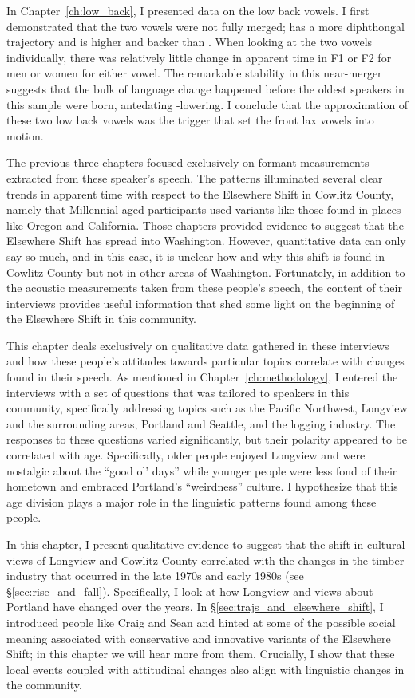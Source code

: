 In Chapter~\ref{ch:low_back}, I presented data on the low back vowels. I first demonstrated that the two vowels were not fully merged;  \thought has a more diphthongal trajectory and is higher and backer than \lot. When looking at the two vowels individually, there was relatively little change in apparent time in F1 or F2 for men or women for either vowel. The remarkable stability in this near-merger suggests that the bulk of language change happened before the oldest speakers in this sample were born, antedating \bat-lowering. I conclude that the approximation of these two low back vowels was the trigger that set the front lax vowels into motion.

The previous three chapters focused exclusively on formant measurements extracted from these speaker's speech. The patterns illuminated several clear trends in apparent time with respect to the Elsewhere Shift in Cowlitz County, namely that Millennial-aged participants used variants like those found in places like Oregon and California. Those chapters provided evidence to suggest that the Elsewhere Shift has spread into Washington. However, quantitative data can only say so much, and in this case, it is unclear how and why this shift is found in Cowlitz County but not in other areas of Washington. Fortunately, in addition to the acoustic measurements taken from these people's speech, the content of their interviews provides useful information that shed some light on the beginning of the Elsewhere Shift in this community.

This chapter deals exclusively on qualitative data gathered in these interviews and how these people's attitudes towards particular topics correlate with changes found in their speech. As mentioned in Chapter~\ref{ch:methodology}, I entered the interviews with a set of questions that was tailored to speakers in this community, specifically addressing topics such as the Pacific Northwest, Longview and the surrounding areas, Portland and Seattle, and the logging industry. The responses to these questions varied significantly, but their polarity appeared to be correlated with age. Specifically, older people enjoyed Longview and were nostalgic about the ``good ol' days'' while younger people were less fond of their hometown and embraced Portland's ``weirdness'' culture. I hypothesize that this age division plays a major role in the linguistic patterns found among these people.

In this chapter, I present qualitative evidence to suggest that the shift in cultural views of Longview and Cowlitz County correlated with the changes in the timber industry that occurred in the late 1970s and early 1980s (see \S\ref{sec:rise_and_fall}). Specifically, I look at how Longview and views about Portland have changed over the years. In \S\ref{sec:trajs_and_elsewhere_shift}, I introduced people like Craig and Sean and hinted at some of the possible social meaning associated with conservative and innovative variants of the Elsewhere Shift; in this chapter we will hear more from them. Crucially, I show that these local events coupled with attitudinal changes also align with linguistic changes in the community.


